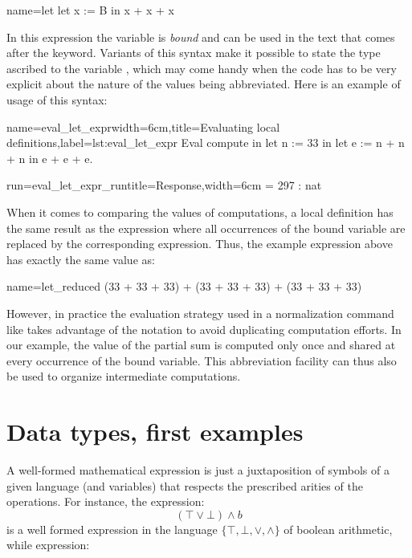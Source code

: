 \begin{coq}{name=let}{}
let x := B in
   x + x + x
\end{coq}

In this expression the variable  is {\em bound} and can be used in
the text that comes after the  keyword.
Variants of this syntax make it possible to state the
type ascribed to the variable , which may come handy when the
code has to be very explicit about the nature of the values being
abbreviated.
Here is an example of usage of this syntax:

\begin{coq}{name=eval_let_expr}{width=6cm,title=Evaluating local definitions,label=lst:eval_let_expr}
Eval compute in
  let n := 33 in
  let e := n + n + n in
    e + e + e.
\end{coq}
\begin{coqout}{run=eval_let_expr_run}{title=Response,width=6cm}
 = 297 : nat
\end{coqout}

When it comes to comparing the values of computations, a local definition
has the same result as the expression where all occurrences of the bound
variable are replaced by the corresponding expression.  Thus, the example
expression above has exactly the same value as:

\begin{coq}{name=let_reduced}{}
(33 + 33 + 33) + (33 + 33 + 33) + (33 + 33 + 33)
\end{coq}

However, in practice the evaluation strategy used in a normalization
command like  takes advantage of the
  notation to
avoid duplicating computation efforts. In our example, the value of
the partial sum  is computed only once and shared at
every occurrence of the bound variable. This abbreviation facility can
thus also be used to organize intermediate computations.

\section{Data types, first examples}

A well-formed mathematical expression is just a juxtaposition of
symbols of a given language (and variables)
that respects the prescribed arities of
the operations. For instance, the expression:
\[(\top \vee \bot) \wedge b\]
is a well formed expression in the language $\{\top, \bot,\vee,\wedge\}$ of
boolean arithmetic, while expression:

